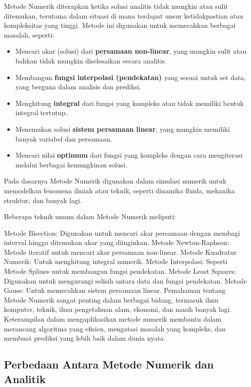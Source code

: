 \documentclass[
]{book}
\theoremstyle{definition}
\theoremstyle{definition}
\theoremstyle{definition}
\theoremstyle{definition}
\theoremstyle{remark}
\begin{document}
Metode Numerik diterapkan ketika solusi analitis tidak mungkin atau sulit ditemukan, terutama dalam situasi di mana terdapat unsur ketidakpastian atau kompleksitas yang tinggi. Metode ini digunakan untuk memecahkan berbagai masalah, seperti:

\begin{itemize}
\item
  Mencari akar (solusi) dari \textbf{persamaan non-linear}, yang mungkin sulit atau bahkan tidak mungkin diselesaikan secara analitis.
\item
  Membangun \textbf{fungsi interpolasi (pendekatan)} yang sesuai untuk set data, yang berguna dalam analisis dan prediksi.
\item
  Menghitung \textbf{integral} dari fungsi yang kompleks atau tidak memiliki bentuk integral tertutup.
\item
  Menemukan solusi \textbf{sistem persamaan linear}, yang mungkin memiliki banyak variabel dan persamaan.
\item
  Mencari nilai \textbf{optimum} dari fungsi yang kompleks dengan cara mengiterasi melalui berbagai kemungkinan solusi.
\end{itemize}

Pada dasarnya Metode Numerik digunakan dalam simulasi numerik untuk memodelkan fenomena ilmiah atau teknik, seperti dinamika fluida, mekanika struktur, dan banyak lagi.

Beberapa teknik umum dalam Metode Numerik meliputi:

Metode Bisection: Digunakan untuk mencari akar persamaan dengan membagi interval hingga ditemukan akar yang diinginkan.
Metode Newton-Raphson: Metode iteratif untuk mencari akar persamaan non-linear.
Metode Kuadratur Numerik: Untuk menghitung integral numerik.
Metode Interpolasi: Seperti Metode Splines untuk membangun fungsi pendekatan.
Metode Least Squares: Digunakan untuk mengurangi selisih antara data dan fungsi pendekatan.
Metode Gauss: Untuk memecahkan sistem persamaan linear.
Pemahaman tentang Metode Numerik sangat penting dalam berbagai bidang, termasuk ilmu komputer, teknik, ilmu pengetahuan alam, ekonomi, dan masih banyak lagi. Keterampilan dalam mengaplikasikan metode numerik membantu dalam merancang algoritma yang efisien, mengatasi masalah yang kompleks, dan membuat prediksi yang lebih baik dalam dunia nyata.

\hypertarget{diffanalitycnumeric}{%
\subsection{Perbedaan Antara Metode Numerik dan Analitik}\label{diffanalitycnumeric}}
\end{document}
